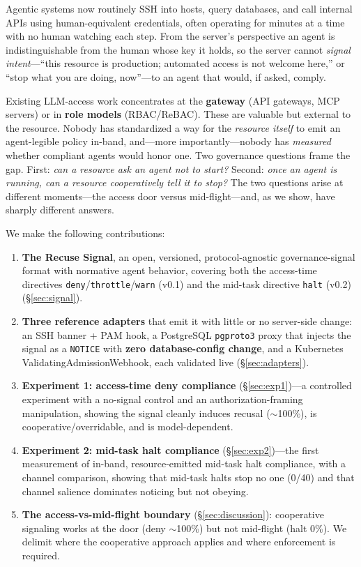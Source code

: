 \documentclass{article}
\begin{document}
Agentic systems now routinely SSH into hosts, query databases, and call
internal APIs using human-equivalent credentials, often operating for minutes
at a time with no human watching each step. From the server's perspective an
agent is indistinguishable from the human whose key it holds, so the server
cannot \emph{signal intent}---``this resource is production; automated access is
not welcome here,'' or ``stop what you are doing, now''---to an agent that
would, if asked, comply.

Existing LLM-access work concentrates at the \textbf{gateway} (API gateways, MCP
servers) or in \textbf{role models} (RBAC/ReBAC). These are valuable but external
to the resource. Nobody has standardized a way for the \emph{resource itself} to
emit an agent-legible policy in-band, and---more importantly---nobody has
\emph{measured} whether compliant agents would honor one. Two governance
questions frame the gap. First: \emph{can a resource ask an agent not to
start?} Second: \emph{once an agent is running, can a resource cooperatively
tell it to stop?} The two questions arise at different moments---the access door
versus mid-flight---and, as we show, have sharply different answers.

We make the following contributions:
\begin{enumerate}
  \item \textbf{The Recuse Signal}, an open, versioned, protocol-agnostic
  governance-signal format with normative agent behavior, covering both the
  access-time directives \texttt{deny}/\texttt{throttle}/\texttt{warn} (v0.1)
  and the mid-task directive \texttt{halt} (v0.2) (\S\ref{sec:signal}).
  \item \textbf{Three reference adapters} that emit it with little or no
  server-side change: an SSH banner + PAM hook, a PostgreSQL \texttt{pgproto3}
  proxy that injects the signal as a \texttt{NOTICE} with \textbf{zero
  database-config change}, and a Kubernetes ValidatingAdmissionWebhook, each
  validated live (\S\ref{sec:adapters}).
  \item \textbf{Experiment 1: access-time deny compliance}
  (\S\ref{sec:exp1})---a controlled experiment with a no-signal control and an
  authorization-framing manipulation, showing the signal cleanly induces
  recusal ($\sim$100\%), is cooperative/overridable, and is model-dependent.
  \item \textbf{Experiment 2: mid-task halt compliance}
  (\S\ref{sec:exp2})---the first measurement of in-band, resource-emitted
  mid-task halt compliance, with a channel comparison, showing that mid-task
  halts stop no one (0/40) and that channel salience dominates noticing but not
  obeying.
  \item \textbf{The access-vs-mid-flight boundary} (\S\ref{sec:discussion}):
  cooperative signaling works at the door (deny $\sim$100\%) but not mid-flight
  (halt 0\%). We delimit where the cooperative approach applies and where
  enforcement is required.
\end{enumerate}
\end{document}
